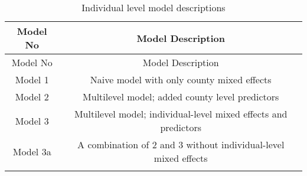 \documentclass[12pt,twoside]{reedthesis}
\begin{document}
  \begin{longtable}[]{@{}cc@{}}
  \caption{Individual level model descriptions
  \label{tab:model_desc_individual}}\tabularnewline
  \toprule
  \begin{minipage}[b]{0.15\columnwidth}\centering\strut
  Model No\strut
  \end{minipage} & \begin{minipage}[b]{0.80\columnwidth}\centering\strut
  Model Description\strut
  \end{minipage}\tabularnewline
  \midrule
  \endfirsthead
  \toprule
  \begin{minipage}[b]{0.15\columnwidth}\centering\strut
  Model No\strut
  \end{minipage} & \begin{minipage}[b]{0.80\columnwidth}\centering\strut
  Model Description\strut
  \end{minipage}\tabularnewline
  \midrule
  \endhead
  \begin{minipage}[t]{0.15\columnwidth}\centering\strut
  Model 1\strut
  \end{minipage} & \begin{minipage}[t]{0.80\columnwidth}\centering\strut
  Naive model with only county mixed effects\strut
  \end{minipage}\tabularnewline
  \begin{minipage}[t]{0.15\columnwidth}\centering\strut
  Model 2\strut
  \end{minipage} & \begin{minipage}[t]{0.80\columnwidth}\centering\strut
  Multilevel model; added county level predictors\strut
  \end{minipage}\tabularnewline
  \begin{minipage}[t]{0.15\columnwidth}\centering\strut
  Model 3\strut
  \end{minipage} & \begin{minipage}[t]{0.80\columnwidth}\centering\strut
  Multilevel model; individual-level mixed effects and predictors\strut
  \end{minipage}\tabularnewline
  \begin{minipage}[t]{0.15\columnwidth}\centering\strut
  Model 3a\strut
  \end{minipage} & \begin{minipage}[t]{0.80\columnwidth}\centering\strut
  A combination of 2 and 3 without individual-level mixed effects\strut
  \end{minipage}\tabularnewline
  \begin{minipage}[t]{0.15\columnwidth}\centering\strut

\end{minipage}
\end{longtable}
\end{document}
